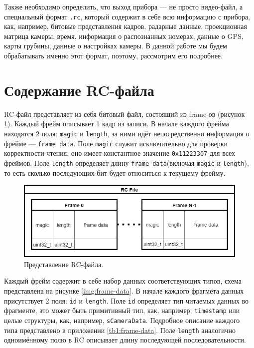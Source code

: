 \documentclass[specification,annotation,times]{itmo-student-thesis}
\begin{document}
Также необходимо определить, что выход прибора --- не просто видео-файл, а специальный формат \texttt{.rc}, который содержит в себе всю информацию с прибора, как, например, битовые представления кадров, радарные данные, проекционная матрица камеры, время, информация о распознанных номерах, данные о GPS, карты грубины, данные о настройках камеры. В данной работе мы будем обрабатывать именно этот формат, поэтому, рассмотрим его подробнее.

\section{Содержание RC-файла} \label{par:rc-description}

RC-файл представляет из себя битовый файл, состоящий из frame-ов (рисунок \ref{img:rc-file}). Каждый фрейм описывает 1 кадр из записи. В начале каждого фрейма находятся 2 поля: \texttt{magic} и \texttt{length}, за ними идёт непосредственно информация о фрейме --- \texttt{frame data}. Поле \texttt{magic} служит исключительно для проверки корректности чтения, оно имеет константное значение \texttt{0x11223307} для всех фреймов. Поле \texttt{length} определяет длину \texttt{frame data}(включая \texttt{magic} и \texttt{length}), то есть сколько последующих бит будет относиться к текущему фрейму.  

\begin{figure}[!ht]
	\caption{Представление RC-файла.}\label{img:rc-file}
	\includegraphics[width=0.85\linewidth]{../png/rc_file.png}
	\centering
\end{figure}

Каждый фрейм содержит в себе набор данных соответствующих типов, схема представлена на рисунке \ref{img:frame-data}. В начале каждого фрагмета данных присутствует 2 поля: \texttt{id} и \texttt{length}. Поле \texttt{id} определяет тип читаемых данных во фрагменте, это может быть примитивный тип, как, например, \texttt{timestamp} или целые структуры, как, например, \texttt{sCameraData}. Подробное описание каждого типа представлено в приложении \ref{tb1:frame-data}. Поле \texttt{length} аналогично одноимённому полю в RC описывает длину последующей последовательности.
\end{document}
